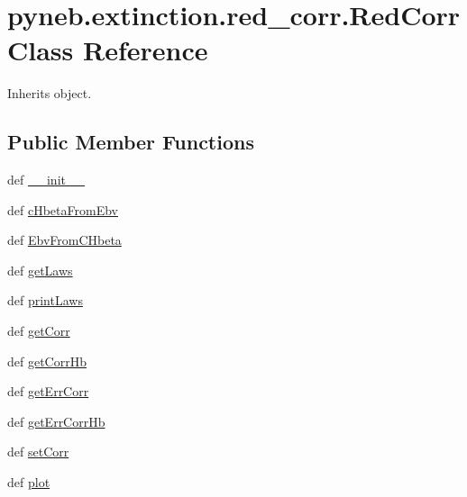 \hypertarget{classpyneb_1_1extinction_1_1red__corr_1_1_red_corr}{\section{pyneb.\-extinction.\-red\-\_\-corr.\-Red\-Corr Class Reference}
\label{classpyneb_1_1extinction_1_1red__corr_1_1_red_corr}
}


Inherits object.

\subsection*{Public Member Functions}
\begin{DoxyCompactItemize}
\item 
def \hyperlink{classpyneb_1_1extinction_1_1red__corr_1_1_red_corr_a27b836e3bd87558f6156a8bf94fbf658}{\-\_\-\-\_\-init\-\_\-\-\_\-}
\item 
def \hyperlink{classpyneb_1_1extinction_1_1red__corr_1_1_red_corr_a1eb5bd704c5f5b7c2c94286b90d33dbb}{c\-Hbeta\-From\-Ebv}
\item 
def \hyperlink{classpyneb_1_1extinction_1_1red__corr_1_1_red_corr_ab35df7348209fb79b956a3c8bb27e759}{Ebv\-From\-C\-Hbeta}
\item 
def \hyperlink{classpyneb_1_1extinction_1_1red__corr_1_1_red_corr_a84e13d28ffcddb1feeb32c0ab62ae29b}{get\-Laws}
\item 
def \hyperlink{classpyneb_1_1extinction_1_1red__corr_1_1_red_corr_a0f5ef5cac970e327841766c07f676c23}{print\-Laws}
\item 
def \hyperlink{classpyneb_1_1extinction_1_1red__corr_1_1_red_corr_a4fd27cfde692dbe6f3ff3d039bde2929}{get\-Corr}
\item 
def \hyperlink{classpyneb_1_1extinction_1_1red__corr_1_1_red_corr_adcef55fc25b8cefce47a0462bf3f9172}{get\-Corr\-Hb}
\item 
def \hyperlink{classpyneb_1_1extinction_1_1red__corr_1_1_red_corr_a6e7097b97a6552f30422884af3faff69}{get\-Err\-Corr}
\item 
def \hyperlink{classpyneb_1_1extinction_1_1red__corr_1_1_red_corr_a8ed68e860066eafe017e5adcff6b56d9}{get\-Err\-Corr\-Hb}
\item 
def \hyperlink{classpyneb_1_1extinction_1_1red__corr_1_1_red_corr_a75e8027a7bd81d214ac16db221da8073}{set\-Corr}
\item 
def \hyperlink{classpyneb_1_1extinction_1_1red__corr_1_1_red_corr_a95f0d053c5dd67a00f1c1ceefc8da2c0}{plot}
\end{DoxyCompactItemize}
